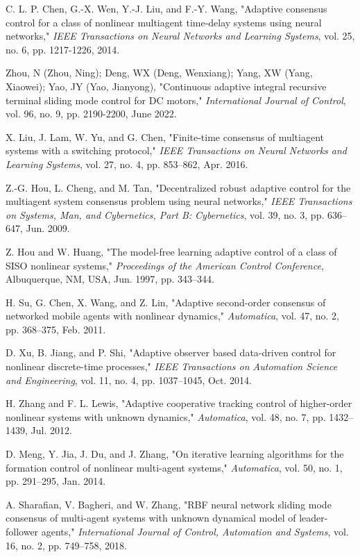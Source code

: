 \documentclass[journal,onecolumn]{IEEEtran}
\begin{document}
\begin{thebibliography}{99}
    C. L. P. Chen, G.-X. Wen, Y.-J. Liu, and F.-Y. Wang, "Adaptive consensus control for a class of nonlinear multiagent time-delay systems using neural networks," \textit{IEEE Transactions on Neural Networks and Learning Systems}, vol. 25, no. 6, pp. 1217-1226, 2014.
    
    Zhou, N (Zhou, Ning); Deng, WX (Deng, Wenxiang); Yang, XW (Yang, Xiaowei); Yao, JY (Yao, Jianyong), "Continuous adaptive integral recursive terminal sliding mode control for DC motors," \textit{International Journal of Control}, vol. 96, no. 9, pp. 2190-2200, June 2022.
    
    X. Liu, J. Lam, W. Yu, and G. Chen, "Finite-time consensus of multiagent systems with a switching protocol," \emph{IEEE Transactions on Neural Networks and Learning Systems}, vol. 27, no. 4, pp. 853–862, Apr. 2016.
    
    Z.-G. Hou, L. Cheng, and M. Tan, "Decentralized robust adaptive control for the multiagent system consensus problem using neural networks," \emph{IEEE Transactions on Systems, Man, and Cybernetics, Part B: Cybernetics}, vol. 39, no. 3, pp. 636–647, Jun. 2009.
    
    Z. Hou and W. Huang, "The model-free learning adaptive control of a class of SISO nonlinear systems," \emph{Proceedings of the American Control Conference}, Albuquerque, NM, USA, Jun. 1997, pp. 343–344.
    
    H. Su, G. Chen, X. Wang, and Z. Lin, "Adaptive second-order consensus of networked mobile agents with nonlinear dynamics," \emph{Automatica}, vol. 47, no. 2, pp. 368–375, Feb. 2011.
    
    D. Xu, B. Jiang, and P. Shi, "Adaptive observer based data-driven control for nonlinear discrete-time processes," \emph{IEEE Transactions on Automation Science and Engineering}, vol. 11, no. 4, pp. 1037–1045, Oct. 2014.
    
    H. Zhang and F. L. Lewis, "Adaptive cooperative tracking control of higher-order nonlinear systems with unknown dynamics," \emph{Automatica}, vol. 48, no. 7, pp. 1432–1439, Jul. 2012.
    
    D. Meng, Y. Jia, J. Du, and J. Zhang, "On iterative learning algorithms for the formation control of nonlinear multi-agent systems," \emph{Automatica}, vol. 50, no. 1, pp. 291–295, Jan. 2014.

    A. Sharafian, V. Bagheri, and W. Zhang, "RBF neural network sliding mode consensus of multi-agent systems with unknown dynamical model of leader-follower agents," \textit{International Journal of Control, Automation and Systems}, vol. 16, no. 2, pp. 749–758, 2018.


\end{thebibliography}
\end{document}
